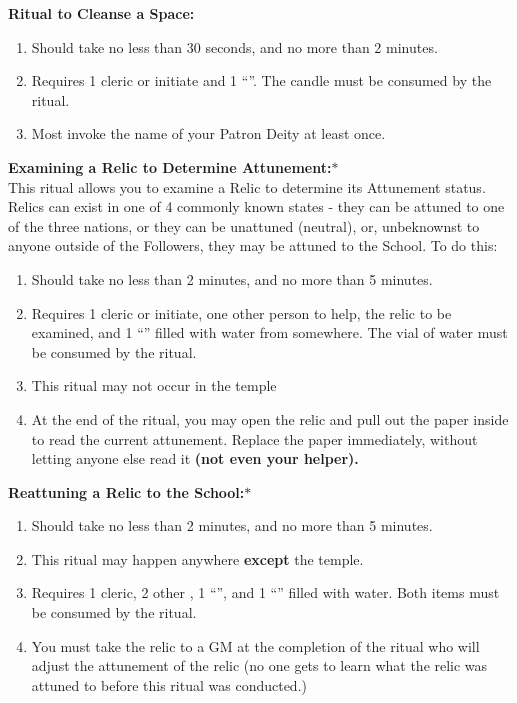 \documentclass[green]{GL2020}
\begin{document}
\textbf{Ritual to Cleanse a Space:}
  \begin{enumerate}
    \item Should take no less than 30 seconds, and no more than 2 minutes.
    \item Requires 1 cleric or initiate and 1 ``\iRitualCandle{}''. The candle must be consumed by the ritual.
    \item Most invoke the name of your Patron Deity at least once.
  \end{enumerate}
   
\textbf{Examining a Relic to Determine Attunement:}$*$\\
This ritual allows you to examine a Relic to determine its Attunement status. Relics can exist in one of 4 commonly known states - they can be attuned to one of the three nations, or they can be unattuned (neutral), or, unbeknownst to anyone outside of the Followers, they may be attuned to the School. To do this:
  \begin{enumerate}
    \item Should take no less than 2 minutes, and no more than 5 minutes.
    \item Requires 1 cleric or initiate, one other person to help, the relic to be examined, and 1 ``\iGlassVial{}'' filled with water from somewhere. The vial of water must be consumed by the ritual. 
		\item This ritual may not occur in the temple
    \item At the end of the ritual, you may open the relic and pull out the paper inside to read the current attunement. Replace the paper immediately, without letting anyone else read it \textbf{(not even your helper).}
  \end{enumerate}
   
\textbf{Reattuning a Relic to the School:}$*$\\
  \begin{enumerate}
    \item Should take no less than 2 minutes, and no more than 5 minutes.
    \item This ritual may happen anywhere \textbf{except} the temple.
    \item Requires 1 cleric, 2 other \pGoaties{}, 1 ``\iRitualCandle{}'', and 1 ``\iGlassVial{}'' filled with water.  Both items must be consumed by the ritual.
    \item You must take the relic to a GM at the completion of the ritual who will adjust the attunement of the relic (no one gets to learn what the relic was attuned to before this ritual was conducted.)
  \end{enumerate}
   
\end{document}

